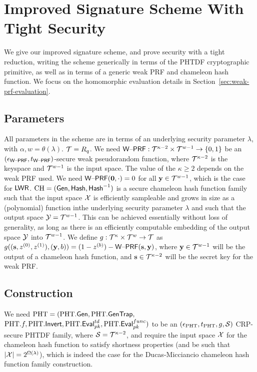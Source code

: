 \section{Improved Signature Scheme With Tight Security}
\label{sec:func-eval}

We give our improved signature scheme, and prove
security with a tight reduction, writing
the scheme generically in terms of the PHTDF cryptographic primitive,
as well as in terms of a generic weak PRF and chameleon hash
function. We
focus on the homomorphic evaluation details in Section~\ref{sec:weak-prf-evaluation}.

\subsection{Parameters}
\label{sec:sig-params}
All parameters in the scheme are in terms of an underlying security
parameter $\lambda$, with
$\alpha,w=\theta(\lambda)$. $\mathcal{T}=R_q$. 
We need $\mathsf{W\text{\textendash}PRF}: \mathcal{T}^{\kappa-2} \times \mathcal{T}^{w-1} \to \{0,1\}$ be an
$(\epsilon_{\mathsf{W\text{\textendash}PRF}},t_{\mathsf{W\text{\textendash}PRF}})$-secure weak pseudorandom
function, where $\mathcal{T}^{\kappa-2}$ is the keyspace and $\mathcal{T}^{w-1}$ is the
input space. The value of the $\kappa\geq 2$ depends on the weak PRF used.
We need $\mathsf{W\text{\textendash}PRF}(\mathbf{0},\cdot)=0$ for all
$\mathbf{y} \in \mathcal{T}^{w-1}$, which is the case for $\mathsf{LWR}$.
 $\text{CH} = (\mathsf{Gen},\mathsf{Hash},\mathsf{Hash}^{-1})$ is a secure chameleon
hash function family such that the input space $\mathcal{X}$ is efficiently
sampleable and grows in size as a
(polynomial) function inthe underlying security parameter $\lambda$
and such that the output space
$\mathcal{Y}=\mathcal{T}^{w-1}$. This can be achieved essentially without loss of
generality, as long as there is an efficiently
computable embedding of the output space $\mathcal{Y}$ into
$\mathcal{T}^{w-1}$.
We define $g:\mathcal{T}^{\kappa} \times \mathcal{T}^{w} \to \mathcal{T}$ as
$g((\mathbf{s},z^{(0)},z^{(1)}),(\mathbf{y},b))=(1-z^{(b)})-\mathsf{W\text{\textendash}PRF}(\mathbf{s},\mathbf{y})$,
where $\mathbf{y} \in \mathcal{T}^{w-1}$ will be the output of a
chameleon hash function, and $\mathbf{s} \in \mathcal{T}^{\kappa-2}$ will be the
secret key for the weak PRF. 



\subsection{Construction}
\label{sec:construction}
We need $\text{PHT}=(\text{PHT}.\mathsf{Gen}, \text{PHT}.\mathsf{GenTrap},$\\ 
$\text{PHT}.f,\text{PHT}.\mathsf{Invert},\text{PHT}.\mathsf{Eval}_{pk}^{td},\text{PHT}.\mathsf{Eval}_{pk}^{func})$ to be an $(\epsilon_{\text{PHT}},t_{\text{PHT}},g,\mathcal{S})$
CRP-secure PHTDF family, where $\mathcal{S}=\mathcal{T}^{\kappa-2}$, and require the input space $\mathcal{X}$ for the chameleon
hash function to satisfy shortness properties (and be such that $\lvert\mathcal{X}\rvert=2^{\Omega(\lambda)}$), which is indeed the
case for the Ducas-Micciancio chameleon hash function family construction.

